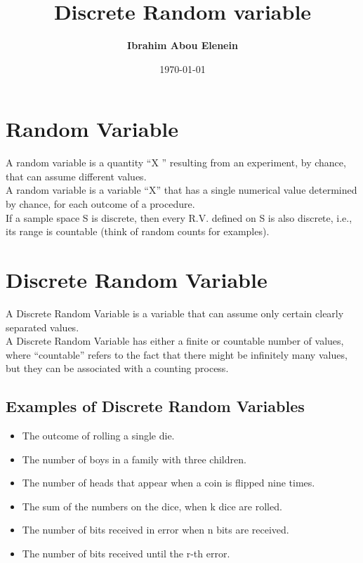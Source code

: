 \documentclass[12pt]{article}
\title{\textbf{Discrete Random variable}} %
\author{\textbf{Ibrahim Abou Elenein}}
\date{\today} %
\theoremstyle{definition}
\begin{document}
\setlength{\droptitle}{-5em}    
\maketitle
\tableofcontents
\pagebreak

\section{Random Variable}
 A random variable is a quantity “X ” resulting from an experiment, by chance,
 that can assume different values.\\

 A random variable is a variable “X” that
 has a single numerical value determined by chance, for each outcome of a
 procedure.\\

 If a sample space S is discrete, then every R.V.  defined on S is
 also discrete, i.e., its range is countable (think of random counts for
 examples).
\section{Discrete Random Variable}
 A Discrete Random Variable is a variable that can assume only certain clearly
 separated values. \\

 A Discrete Random Variable has either a finite or countable
 number of values, where “countable” refers to the fact that there might be
 infinitely many values, but they can be associated with a counting process.
 \subsection{Examples of Discrete Random Variables}
 \begin{itemize}
     \item The outcome of rolling a single die.
     \item The number of boys in a family with three children.
     \item The number of heads that appear when a coin is flipped nine times.
     \item The sum of the numbers on the dice, when k dice are rolled.
     \item The number of bits received in error when n bits are received.
     \item The number of bits received until the r-th error.
 \end{itemize}
\end{document}
